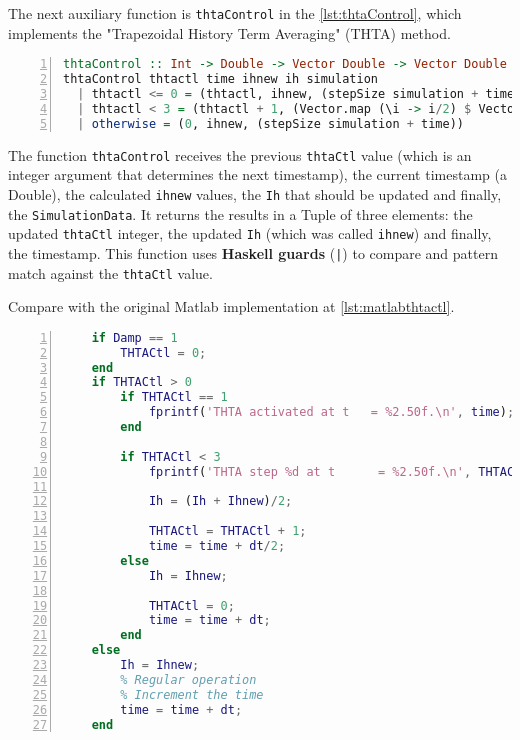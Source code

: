 The next auxiliary function is \lstinline!thtaControl! in the \cref{lst:thtaControl}, which implements the "Trapezoidal History Term Averaging" \cite{thta2015bonatto} (THTA) method. 

\begin{lstlisting}[language=Haskell, numbers=left, caption={Trapezoidal History Term Averaging ETR-P}, captionpos=b, label={lst:thtaControl}]
thtaControl :: Int -> Double -> Vector Double -> Vector Double -> SimulationData -> (Int, Vector Double, Double)
thtaControl thtactl time ihnew ih simulation
  | thtactl <= 0 = (thtactl, ihnew, (stepSize simulation + time))
  | thtactl < 3 = (thtactl + 1, (Vector.map (\i -> i/2) $ Vector.zipWith (+) ih ihnew), (time + (stepSize simulation/2)))
  | otherwise = (0, ihnew, (stepSize simulation + time))
\end{lstlisting}

The function \lstinline!thtaControl! receives the previous \lstinline!thtaCtl! value (which is an integer argument that determines the next timestamp), the current timestamp (a Double), the calculated \lstinline!ihnew! values, the \lstinline!Ih! that should be updated and finally, the \lstinline!SimulationData!. It returns the results in a Tuple of three elements: the updated \lstinline!thtaCtl! integer, the updated \lstinline!Ih! (which was called \lstinline!ihnew!)  and finally, the timestamp. This function uses \textbf{Haskell guards} (\lstinline!|!) to compare and pattern match against the \lstinline!thtaCtl! value.

Compare with the original Matlab implementation at \cref{lst:matlabthtactl}.

\begin{lstlisting}[language=Matlab, numbers=left, caption={THTA Control in Matlab}, captionpos=b, label={lst:matlabthtactl}]
%% THTA Control Here!
    if Damp == 1
        THTACtl = 0;
    end
    if THTACtl > 0
        if THTACtl == 1
            fprintf('THTA activated at t   = %2.50f.\n', time);
        end
        
        if THTACtl < 3
            fprintf('THTA step %d at t      = %2.50f.\n', THTACtl, time);
            
            Ih = (Ih + Ihnew)/2;
            
            THTACtl = THTACtl + 1;
            time = time + dt/2;
        else
            Ih = Ihnew;
            
            THTACtl = 0;
            time = time + dt;
        end
    else
        Ih = Ihnew;        
        % Regular operation
        % Increment the time
        time = time + dt;
    end
\end{lstlisting}

